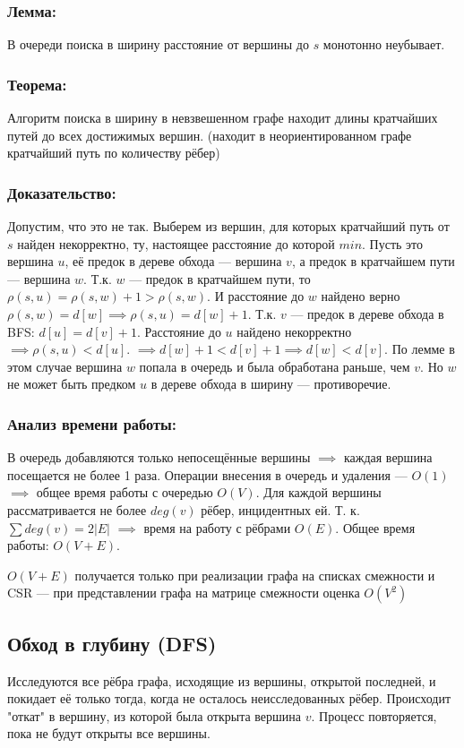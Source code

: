 \subsubsection*{Лемма:}
В очереди поиска в ширину расстояние от вершины до $s$ монотонно неубывает.

\subsubsection*{Теорема:}
Алгоритм поиска в ширину в невзвешенном графе находит длины кратчайших путей до всех достижимых вершин.
(находит в неориентированном графе кратчайший путь по количеству рёбер)

\subsubsection*{Доказательство:}
Допустим, что это не так. Выберем из вершин, для которых кратчайший путь от $s$ найден некорректно, ту, настоящее расстояние до которой $min$. Пусть это вершина $u$, её предок в дереве обхода --- вершина $v$, а предок в кратчайшем пути --- вершина $w$.
Т.к. $w$ --- предок в кратчайшем пути, то $\rho(s,u)=\rho(s,w)+1 > \rho(s,w)$. 
И расстояние до $w$ найдено верно $\rho(s,w)=d[w] \implies \rho(s,u)=d[w]+1$.
Т.к. $v$ --- предок в дереве обхода в BFS: $d[u]=d[v]+1$. 
Расстояние до $u$ найдено некорректно $\implies \rho(s,u) < d[u]$.
$\implies d[w]+1 < d[v]+1 \implies d[w] < d[v]$.
По лемме в этом случае вершина $w$ попала в очередь и была обработана раньше, чем $v$. Но $w$ не может быть предком $u$ в дереве обхода в ширину --- противоречие.

\subsubsection*{Анализ времени работы:}
В очередь добавляются только непосещённые вершины $\implies$ каждая вершина посещается не более 1 раза.
Операции внесения в очередь и удаления --- $O(1)$ $\implies$ общее время работы с очередью $O(V)$.
Для каждой вершины рассматривается не более $deg(v)$ рёбер, инцидентных ей.
Т. к. $\sum deg(v) = 2|E|$ $\implies$ время на работу с рёбрами $O(E)$.
Общее время работы: $O(V+E)$. 
\begin{observation}
	$O(V + E)$ получается только при реализации графа на списках смежности и CSR --- при представлении графа на матрице смежности оценка $O(V^2)$
\end{observation}

\subsection*{Обход в глубину (DFS)}
Исследуются все рёбра графа, исходящие из вершины, открытой последней, и покидает её только тогда, когда не осталось неисследованных рёбер. 
Происходит "откат" в вершину, из которой была открыта вершина $v$. Процесс повторяется, пока не будут открыты все вершины.

